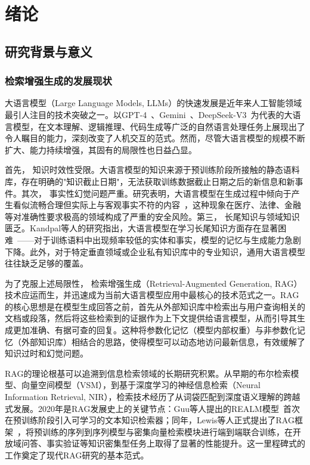 \chapter{绪论}
\label{chap:introduction}

\section{研究背景与意义}

\subsection{检索增强生成的发展现状}

大语言模型（Large Language Models, LLMs）的快速发展是近年来人工智能领域最引人注目的技术突破之一。以GPT-4~\citep{openai2023gpt4}、Gemini~\citep{geminiteam2024gemini15}、DeepSeek-V3~\citep{deepseekai2024deepseekv3}为代表的大语言模型，在文本理解、逻辑推理、代码生成等广泛的自然语言处理任务上展现出了令人瞩目的能力，深刻改变了人机交互的范式。然而，尽管大语言模型的规模不断扩大、能力持续增强，其固有的局限性也日益凸显。

首先， 知识时效性受限。大语言模型的知识来源于预训练阶段所接触的静态语料库，存在明确的"知识截止日期"，无法获取训练数据截止日期之后的新信息和新事件。其次， 事实性幻觉问题严重。研究表明，大语言模型在生成过程中倾向于产生看似流畅合理但实际上与客观事实不符的内容~\citep{xu2025hallucination}，这种现象在医疗、法律、金融等对准确性要求极高的领域构成了严重的安全风险。第三， 长尾知识与领域知识匮乏。Kandpal等人的研究指出，大语言模型在学习长尾知识方面存在显著困难~\citep{kandpal2023largelanguagemodelsstruggle}——对于训练语料中出现频率较低的实体和事实，模型的记忆与生成能力急剧下降。此外，对于特定垂直领域或企业私有知识库中的专业知识，通用大语言模型往往缺乏足够的覆盖。

为了克服上述局限性， 检索增强生成（Retrieval-Augmented Generation, RAG）技术应运而生，并迅速成为当前大语言模型应用中最核心的技术范式之一。RAG的核心思想是在模型生成回答之前，首先从外部知识库中检索出与用户查询相关的文档或段落，然后将这些检索到的证据作为上下文提供给语言模型，从而引导其生成更加准确、有据可查的回复。这种将参数化记忆（模型内部权重）与非参数化记忆（外部知识库）相结合的思路，使得模型可以动态地访问最新信息，有效缓解了知识过时和幻觉问题。

RAG的理论根基可以追溯到信息检索领域的长期研究积累。从早期的布尔检索模型、向量空间模型（VSM），到基于深度学习的神经信息检索（Neural Information Retrieval, NIR），检索技术经历了从词袋匹配到深度语义理解的跨越式发展。2020年是RAG发展史上的关键节点：Guu等人提出的REALM模型~\citep{guu2020realm}首次在预训练阶段引入可学习的文本知识检索器；同年，Lewis等人正式提出了RAG框架~\citep{lewis2020rag}，将预训练的序列到序列模型与密集向量检索模块进行端到端联合训练，在开放域问答、事实验证等知识密集型任务上取得了显著的性能提升。这一里程碑式的工作奠定了现代RAG研究的基本范式。


